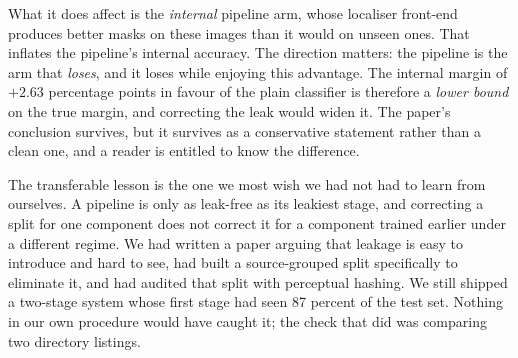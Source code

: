 \documentclass{melba}
\begin{document}
What it does affect is the \emph{internal} pipeline arm, whose localiser front-end produces better masks on these images than it would on unseen ones. That inflates the pipeline's internal accuracy. The direction matters: the pipeline is the arm that \emph{loses}, and it loses while enjoying this advantage. The internal margin of $+2.63$ percentage points in favour of the plain classifier is therefore a \emph{lower bound} on the true margin, and correcting the leak would widen it. The paper's conclusion survives, but it survives as a conservative statement rather than a clean one, and a reader is entitled to know the difference.

The transferable lesson is the one we most wish we had not had to learn from ourselves. A pipeline is only as leak-free as its leakiest stage, and correcting a split for one component does not correct it for a component trained earlier under a different regime. We had written a paper arguing that leakage is easy to introduce and hard to see, had built a source-grouped split specifically to eliminate it, and had audited that split with perceptual hashing. We still shipped a two-stage system whose first stage had seen 87 percent of the test set. Nothing in our own procedure would have caught it; the check that did was comparing two directory listings.
\end{document}
